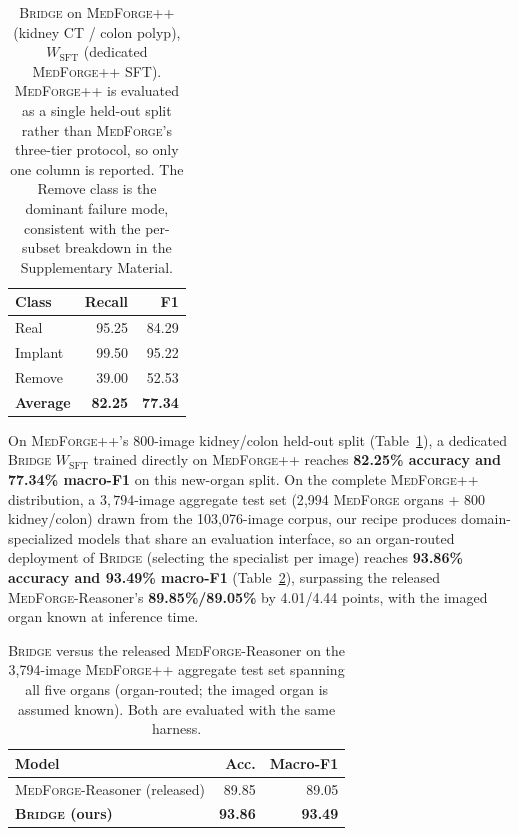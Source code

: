 \documentclass[10pt,twocolumn,letterpaper]{article}
\newcommand{\bridge}{\textsc{Bridge}}
\newcommand{\medforge}{\textsc{MedForge}}
\newcommand{\medforgepp}{\textsc{MedForge++}}
\begin{document}
\begin{table}[t]
\centering
\small
\begin{tabular}{lrr}
\toprule
Class & Recall & F1 \\
\midrule
Real & 95.25 & 84.29 \\
Implant & 99.50 & 95.22 \\
Remove & 39.00 & 52.53 \\
\midrule
\textbf{Average} & \textbf{82.25} & \textbf{77.34} \\
\bottomrule
\end{tabular}
\caption{\bridge{} on \medforgepp{} (kidney CT / colon polyp), $W_{\mathrm{SFT}}$ (dedicated \medforgepp{} SFT). \medforgepp{} is evaluated as a single held-out split rather than \medforge{}'s three-tier protocol, so only one column is reported. The Remove class is the dominant failure mode, consistent with the per-subset breakdown in the Supplementary Material.}
\label{tab:bridge-medforgepp}
\end{table}

On \medforgepp{}'s 800-image kidney/colon held-out split (Table~\ref{tab:bridge-medforgepp}), a dedicated \bridge{} $W_{\mathrm{SFT}}$ trained directly on \medforgepp{} reaches \textbf{82.25\% accuracy and 77.34\% macro-F1} on this new-organ split. On the complete \medforgepp{} distribution, a $3{,}794$-image aggregate test set (2{,}994 \medforge{} organs + 800 kidney/colon) drawn from the 103{,}076-image corpus, our recipe produces domain-specialized models that share an evaluation interface, so an organ-routed deployment of \bridge{} (selecting the specialist per image) reaches \textbf{93.86\% accuracy and 93.49\% macro-F1} (Table~\ref{tab:medforgepp-agg}), surpassing the released \medforge{}-Reasoner's \textbf{89.85\%/89.05\%} by 4.01/4.44 points, with the imaged organ known at inference time.

\begin{table}[t]
\centering
\small
\caption{\bridge{} versus the released \medforge{}-Reasoner on the 3{,}794-image \medforgepp{} aggregate test set spanning all five organs (organ-routed; the imaged organ is assumed known). Both are evaluated with the same harness.}
\label{tab:medforgepp-agg}
\begin{tabular}{lrr}
\toprule
Model & Acc. & Macro-F1 \\
\midrule
\medforge{}-Reasoner (released) & 89.85 & 89.05 \\
\textbf{\bridge{} (ours)} & \textbf{93.86} & \textbf{93.49} \\
\bottomrule
\end{tabular}
\end{table}
\end{document}

